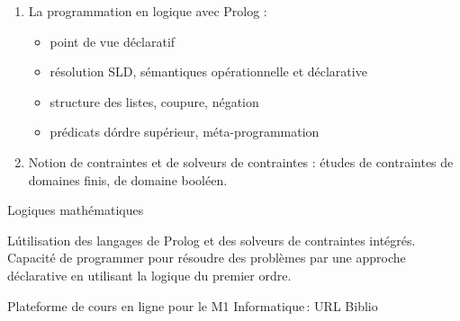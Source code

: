 {
\begin{enumerate}
\item La programmation en logique avec Prolog : 
\begin{itemize}
\item point de vue déclaratif
\item résolution SLD, sémantiques opérationnelle et déclarative
\item structure des listes, coupure, négation
\item prédicats d\'ordre supérieur, méta-programmation
\end{itemize}
\item Notion de contraintes et de solveurs de contraintes : études de contraintes de domaines finis, de domaine booléen.
\end{enumerate}
} 
{Logiques mathématiques
} 
{\begin{itemize}
\ObjItem L\'utilisation des langages de Prolog et des solveurs de contraintes intégrés.
\ObjItem Capacité de programmer pour résoudre des problèmes par une approche déclarative en utilisant la logique du premier ordre.
 \end{itemize} 
} 
{Plateforme de cours en ligne pour le M1 Informatique\,: URL} 
{Biblio} 
 
\vfill

